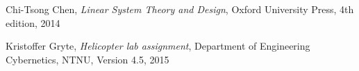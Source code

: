 
\begin{thebibliography}{9}
  Chi-Tsong Chen,
  \emph{Linear System Theory and Design},
  Oxford University Press,
  4th edition,
  2014

  Kristoffer Gryte,
  \emph{Helicopter lab assignment},
  Department of Engineering Cybernetics,
  NTNU,
  Version 4.5,
  2015
\end{thebibliography}
